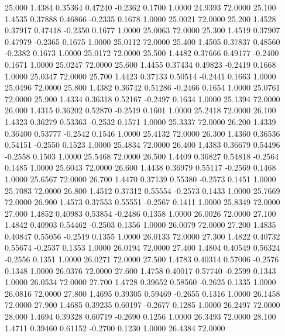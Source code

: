   25.000   1.4384   0.35364   0.47240  -0.2362   0.1700   1.0000  24.9393  72.0000
  25.100   1.4535   0.37888   0.46866  -0.2335   0.1678   1.0000  25.0021  72.0000
  25.200   1.4528   0.37917   0.47418  -0.2350   0.1677   1.0000  25.0063  72.0000
  25.300   1.4519   0.37907   0.47979  -0.2365   0.1675   1.0000  25.0112  72.0000
  25.400   1.4505   0.37837   0.48560  -0.2382   0.1673   1.0000  25.0172  72.0000
  25.500   1.4482   0.37666   0.49177  -0.2400   0.1671   1.0000  25.0247  72.0000
  25.600   1.4455   0.37434   0.49823  -0.2419   0.1668   1.0000  25.0347  72.0000
  25.700   1.4423   0.37133   0.50514  -0.2441   0.1663   1.0000  25.0496  72.0000
  25.800   1.4382   0.36742   0.51286  -0.2466   0.1654   1.0000  25.0761  72.0000
  25.900   1.4334   0.36318   0.52167  -0.2497   0.1634   1.0000  25.1394  72.0000
  26.000   1.4315   0.36202   0.52870  -0.2519   0.1601   1.0000  25.2418  72.0000
  26.100   1.4323   0.36279   0.53363  -0.2532   0.1571   1.0000  25.3337  72.0000
  26.200   1.4339   0.36400   0.53777  -0.2542   0.1546   1.0000  25.4132  72.0000
  26.300   1.4360   0.36536   0.54151  -0.2550   0.1523   1.0000  25.4834  72.0000
  26.400   1.4383   0.36679   0.54496  -0.2558   0.1503   1.0000  25.5468  72.0000
  26.500   1.4409   0.36827   0.54818  -0.2564   0.1485   1.0000  25.6043  72.0000
  26.600   1.4438   0.36979   0.55117  -0.2569   0.1468   1.0000  25.6567  72.0000
  26.700   1.4470   0.37139   0.55380  -0.2573   0.1451   1.0000  25.7083  72.0000
  26.800   1.4512   0.37312   0.55554  -0.2573   0.1433   1.0000  25.7669  72.0000
  26.900   1.4573   0.37553   0.55551  -0.2567   0.1411   1.0000  25.8349  72.0000
  27.000   1.4852   0.40983   0.53854  -0.2486   0.1358   1.0000  26.0026  72.0000
  27.100   1.4842   0.40903   0.54462  -0.2503   0.1356   1.0000  26.0079  72.0000
  27.200   1.4835   0.40847   0.55056  -0.2519   0.1355   1.0000  26.0133  72.0000
  27.300   1.4822   0.40732   0.55674  -0.2537   0.1353   1.0000  26.0194  72.0000
  27.400   1.4804   0.40549   0.56324  -0.2556   0.1351   1.0000  26.0271  72.0000
  27.500   1.4783   0.40314   0.57006  -0.2576   0.1348   1.0000  26.0376  72.0000
  27.600   1.4758   0.40017   0.57740  -0.2599   0.1343   1.0000  26.0534  72.0000
  27.700   1.4728   0.39652   0.58560  -0.2625   0.1335   1.0000  26.0816  72.0000
  27.800   1.4695   0.39305   0.59469  -0.2655   0.1316   1.0000  26.1458  72.0000
  27.900   1.4685   0.39235   0.60197  -0.2677   0.1285   1.0000  26.2497  72.0000
  28.000   1.4694   0.39328   0.60719  -0.2690   0.1256   1.0000  26.3493  72.0000
  28.100   1.4711   0.39460   0.61152  -0.2700   0.1230   1.0000  26.4384  72.0000
